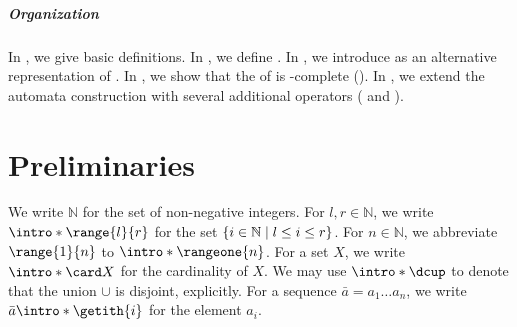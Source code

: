\documentclass[10pt,a4paper]{article}
\theoremstyle{definition}
\theoremstyle{remark}
\DeclarePairedDelimiter\set{\{}{\}}
\newcommand{\nat}{\mathbb{N}}
\newcommand{\mul}[1]{\bar{#1}}
\begin{document}
\begin{scope}
%
%
%
%

\subparagraph*{Organization}
In , we give basic definitions.
In , we define .
In , we introduce  as an alternative representation of .
In ,
we show that the  of  is -complete ().
In , we extend the automata construction with several additional operators ( and ).
\end{scope}
 
%

\section{Preliminaries}\label{section: preliminaries}
We write $\nat$ for the set of non-negative integers.
\AP
For $l, r \in \nat$, we write $\intro*\range{l}{r}$ for the set $\set{i \in \nat \mid l \le i \le r}$.
\AP
For $n \in \nat$, we abbreviate $\range{1}{n}$ to $\intro*\rangeone{n}$.
\AP
For a set $X$,
we write $\intro*\card X$ for the cardinality of $X$. %
\AP
We may use $\intro*\dcup$ to denote that the union $\cup$ is disjoint, explicitly.
\AP For a sequence $\mul{a} = a_1 \dots a_n$,
we write $\mul{a}\intro*\getith{i}$ for the element $a_i$.
\end{document}
